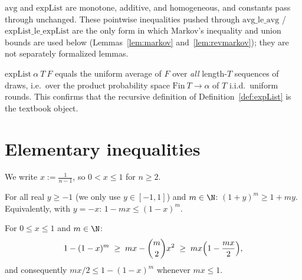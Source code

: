 \begin{lemma}\label{lem:avg-basic}
  \leanok
  $\mathrm{avg}$ and $\mathrm{expList}$ are monotone, additive, and
  homogeneous, and constants pass through unchanged. These pointwise
  inequalities pushed through $\mathrm{avg\_le\_avg}$ /
  $\mathrm{expList\_le\_expList}$ are the only form in which Markov's
  inequality and union bounds are used below (Lemmas~\ref{lem:markov}
  and~\ref{lem:revmarkov}); they are not separately formalized lemmas.
\end{lemma}

\begin{theorem}\label{thm:faithful}
  \leanok
  $\mathrm{expList}\ \alpha\ T\ F$ equals the uniform average of $F$ over
  \emph{all} length-$T$ sequences of draws, i.e.\ over the product
  probability space $\mathrm{Fin}\ T \to \alpha$ of $T$ i.i.d.\ uniform
  rounds. This confirms that the recursive definition of
  Definition~\ref{def:expList} is the textbook object.
\end{theorem}

\section{Elementary inequalities}\label{sec:ineq}

We write $x := \tfrac{1}{n-1}$, so $0 < x \le 1$ for $n \ge 2$.

\begin{lemma}[Bernoulli]\label{lem:bernoulli}
  \leanok
  For all real $y \ge -1$ (we only use $y\in[-1,1]$) and $m \in \N$:
  $(1+y)^m \ge 1 + my$. Equivalently, with $y = -x$:
  $1 - mx \le (1-x)^m$.
\end{lemma}

\begin{lemma}\label{lem:bonferroni}
  \leanok
  For $0 \le x \le 1$ and $m \in \N$:
  \[
    1-(1-x)^m \;\ge\; mx - \binom{m}{2}x^2 \;\ge\; mx\Bigl(1-\frac{mx}{2}\Bigr),
  \]
  and consequently $mx/2 \le 1-(1-x)^m$ whenever $mx \le 1$.
\end{lemma}


